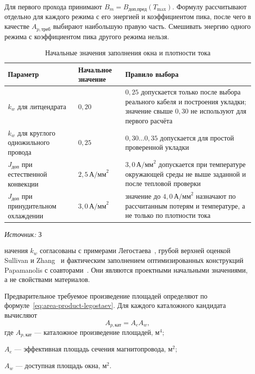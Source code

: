 \documentclass[14pt,a4paper]{extarticle}
\newcommand{\source}[1]{\par\noindent\textit{Источник:} #1\par}
\begin{document}
Для первого прохода принимают
$B_m=B_{\text{доп,пред}}(T_{\max})$. Формулу рассчитывают отдельно для
каждого режима с его энергией и коэффициентом пика, после чего в качестве
$A_{p,\text{треб}}$ выбирают наибольшую правую часть. Смешивать энергию
одного режима с коэффициентом пика другого режима нельзя.

\begin{table}[H]
\caption{Начальные значения заполнения окна и плотности тока}
\label{tab:kw-j}
\centering
\small
\begin{tabularx}{\textwidth}{>{\raggedright\arraybackslash}p{43mm}
>{\raggedleft\arraybackslash}p{37mm} X}
\toprule
Параметр & Начальное значение & Правило выбора \\
\midrule
$k_w$ для литцендрата & $0{,}20$ &
$0{,}25$ допускается только после выбора реального кабеля и построения
укладки; значение свыше $0{,}30$ не используют для первого расчёта \\
$k_w$ для круглого одножильного провода & $0{,}25$ &
$0{,}30\ldots0{,}35$ допускается для простой проверенной укладки \\
$J_{\text{доп}}$ при естественной конвекции &
$2{,}5\,\text{А/мм}^2$ &
$3{,}0\,\text{А/мм}^2$ допускается при температуре окружающей среды не выше
заданной и после тепловой проверки \\
$J_{\text{доп}}$ при принудительном охлаждении &
$3{,}0\,\text{А/мм}^2$ &
значение до $4{,}0\,\text{А/мм}^2$ назначают по рассчитанным потерям и
температуре, а не только по плотности тока \\
\bottomrule
\end{tabularx}
\end{table}

\source Значения $k_w$ согласованы с примерами
Легостаева~\cite{legostaev}, грубой верхней оценкой Sullivan и
Zhang~\cite{sullivan} и фактическим заполнением оптимизированных конструкций
Papamanolis с соавторами~\cite{papamanolis}. Они являются проектными
начальными значениями, а не свойствами материалов.

Предварительное требуемое произведение площадей определяют по
формуле~\eqref{eq:area-product-legostaev}. Для каждого каталожного
кандидата вычисляют
\begin{equation}
 A_{p,\text{кат}}=A_eA_w,
 \label{eq:catalog-area-product}
\end{equation}
где $A_{p,\text{кат}}$ --- каталожное произведение площадей, м$^4$;\par\noindent
$A_e$ --- эффективная площадь сечения магнитопровода, м$^2$;\par\noindent
$A_w$ --- доступная площадь окна, м$^2$.
\end{document}
